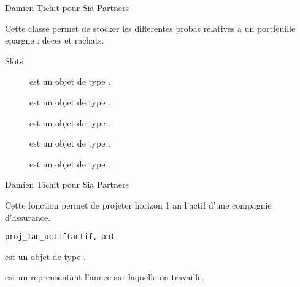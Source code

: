 \documentclass[a4paper]{book}
\begin{document}
%
\begin{Author}\relax
Damien Tichit pour Sia Partners
\end{Author}
%
\begin{Description}\relax
Cette classe permet de stocker les differentes probas relatives a un portfeuille epargne : deces et rachats.
\end{Description}
%
\begin{Section}{Slots}

\begin{description}

\item[] est un objet de type .

\item[] est un objet de type .

\item[] est un objet de type .

\item[] est un objet de type .

\item[] est un objet de type .

\end{description}
\end{Section}
%
\begin{Author}\relax
Damien Tichit pour Sia Partners
\end{Author}
%
\begin{Description}\relax
Cette fonction permet de projeter horizon 1 an l'actif d'une compagnie d'assurance.
\end{Description}
%
\begin{Usage}
\begin{verbatim}
proj_1an_actif(actif, an)
\end{verbatim}
\end{Usage}
%
\begin{Arguments}
\begin{ldescription}
\item[\code{actif}] est un objet de type .

\item[\code{an}] est un  reprensentant l'annee sur laquelle on travaille.
\end{ldescription}
\end{Arguments}
\end{document}
